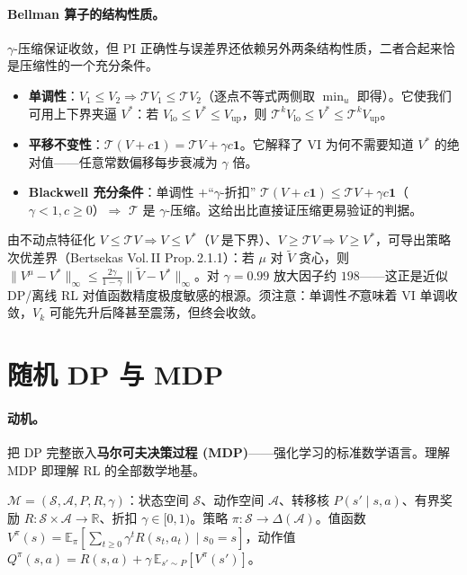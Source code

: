 \paragraph{Bellman 算子的结构性质。}$\gamma$-压缩保证收敛，但 PI 正确性与误差界还依赖另外两条结构性质，二者合起来恰是压缩性的一个充分条件。
\begin{itemize}
  \item \textbf{单调性}：$V_1\le V_2\Rightarrow\mathcal TV_1\le\mathcal TV_2$（逐点不等式两侧取 $\min_u$ 即得）。它使我们可用上下界夹逼 $V^*$：若 $V_{\mathrm{lo}}\le V^*\le V_{\mathrm{up}}$，则 $\mathcal T^kV_{\mathrm{lo}}\le V^*\le\mathcal T^kV_{\mathrm{up}}$。
  \item \textbf{平移不变性}：$\mathcal T(V+c\mathbf 1)=\mathcal TV+\gamma c\mathbf 1$。它解释了 VI 为何不需要知道 $V^*$ 的绝对值——任意常数偏移每步衰减为 $\gamma$ 倍。
  \item \textbf{Blackwell 充分条件}\cite{blackwell1965discounted}：单调性 $+$“$\gamma$-折扣” $\mathcal T(V+c\mathbf 1)\le\mathcal TV+\gamma c\mathbf 1$（$\gamma<1,c\ge0$）$\Rightarrow$ $\mathcal T$ 是 $\gamma$-压缩。这给出比直接证压缩更易验证的判据。
\end{itemize}
由不动点特征化 $V\le\mathcal TV\Rightarrow V\le V^*$（$V$ 是下界）、$V\ge\mathcal TV\Rightarrow V\ge V^*$，可导出策略次优差界（Bertsekas Vol.\,II Prop.\,2.1.1）：若 $\mu$ 对 $\tilde V$ 贪心，则 $\|V^\mu-V^*\|_\infty\le\tfrac{2\gamma}{1-\gamma}\|\tilde V-V^*\|_\infty$。对 $\gamma=0.99$ 放大因子约 $198$——这正是近似 DP/离线 RL 对值函数精度极度敏感的根源。须注意：单调性\emph{不}意味着 VI 单调收敛，$V_k$ 可能先升后降甚至震荡，但终会收敛。

\section{随机 DP 与 MDP}
\label{sec:dp-mdp}

\paragraph{动机。}
把 DP 完整嵌入\textbf{马尔可夫决策过程 (MDP)}——强化学习的标准数学语言。理解 MDP 即理解 RL 的全部数学地基。

\begin{definition}\label{def:dp-mdp}
$\mathcal M=(\mathcal S,\mathcal A,P,R,\gamma)$：状态空间 $\mathcal S$、动作空间 $\mathcal A$、转移核 $P(s'\mid s,a)$、有界奖励 $R:\mathcal S\times\mathcal A\to\mathbb R$、折扣 $\gamma\in[0,1)$。策略 $\pi:\mathcal S\to\Delta(\mathcal A)$。值函数 $V^\pi(s)=\mathbb E_\pi[\sum_{t\ge0}\gamma^tR(s_t,a_t)\mid s_0=s]$，动作值 $Q^\pi(s,a)=R(s,a)+\gamma\,\mathbb E_{s'\sim P}[V^\pi(s')]$。
\end{definition}

